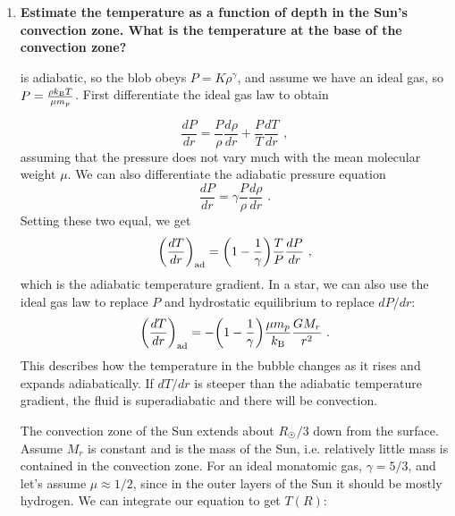 \begin{enumerate}
\item \textbf{Estimate the temperature as a function of depth in the Sun's convection zone. What is the temperature at the base of the convection zone?}

	 is adiabatic, so the blob obeys $P = K \rho ^\gamma$, and assume we have an ideal gas, so $P = \frac{\rho k_{\rm B} T}{\mu m_p}$. First differentiate the ideal gas law to obtain
	
	\begin{equation}
	\frac{dP}{dr} = \frac{P}{\rho} \frac{d \rho}{dr} + \frac{P}{T} \frac{d T}{dr} \,\, ,
	\end{equation}
	assuming that the pressure does not vary much with the mean molecular weight $\mu$. We can also differentiate the adiabatic pressure equation
	\begin{equation}
	\frac{dP}{dr} = \gamma \frac{P}{\rho}\frac{d\rho}{dr}\,\, .
	\end{equation}
	Setting these two equal, we get
	\begin{equation}
	\biggl(\frac{dT}{dr}\biggr)_{\rm ad} = \biggl(1 - \frac{1}{\gamma}\biggr)\frac{T}{P} \frac{dP}{dr}\,\, ,
	\end{equation}
	which is the adiabatic temperature gradient. In a star, we can also use the ideal gas law to replace $P$ and hydrostatic equilibrium to replace $dP/dr$:
	\begin{equation}\label{conv}
	\biggl(\frac{dT}{dr}\biggr)_{\rm ad} = -\biggl(1 - \frac{1}{\gamma}\biggr)\frac{\mu m_p}{k_{\rm B}} \frac{G M_r}{r^2}\,\, .
	\end{equation}
	This describes how the temperature in the bubble changes as it rises and expands adiabatically. If $dT/dr$ is steeper than the adiabatic temperature gradient, the fluid is superadiabatic and there will be convection.
	
	The convection zone of the Sun extends about $R_\astrosun/3$ down from the surface. Assume $M_r$ is constant and is the mass of the Sun, i.e. relatively little mass is contained in the convection zone. For an ideal monatomic gas, $\gamma = 5/3$, and let's assume $\mu \approx 1/2$, since in the outer layers of the Sun it should be mostly hydrogen. We can integrate our equation to get $T(R)$:
	

\end{enumerate}
